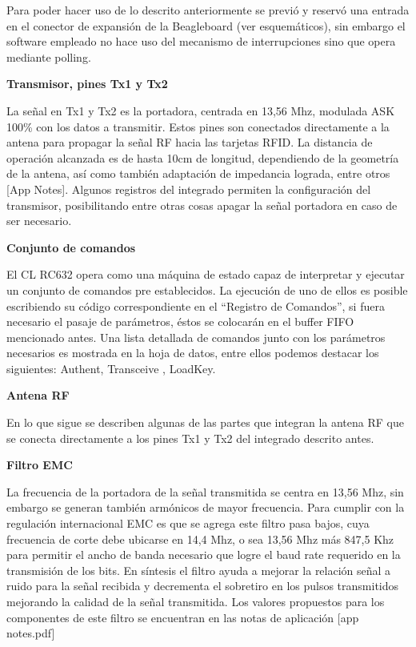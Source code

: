 Para poder hacer uso de lo descrito anteriormente se previó y reservó una entrada en el conector de expansión de la Beagleboard (ver esquemáticos), sin embargo el software empleado no hace uso del mecanismo de interrupciones sino que opera mediante polling.

\bigskip
{\bf{Transmisor, pines Tx1 y Tx2}}

La señal en Tx1 y Tx2 es la portadora, centrada en 13,56 Mhz, modulada ASK 100\% con los datos a transmitir. Estos pines son conectados directamente a la antena para propagar la señal RF hacia las tarjetas RFID. La distancia de operación alcanzada es de hasta 10cm de longitud, dependiendo de la geometría de la antena, así como también adaptación de impedancia lograda, entre otros [App Notes].
Algunos registros del integrado permiten la configuración del transmisor, posibilitando entre otras cosas apagar la señal portadora en caso de ser necesario.

\bigskip
{\bf{Conjunto de comandos}}

El CL RC632 opera como una máquina de estado capaz de interpretar y ejecutar un conjunto de comandos pre establecidos. La ejecución de uno de ellos es posible escribiendo su código correspondiente en el “Registro de Comandos”, si fuera necesario el pasaje de parámetros, éstos se colocarán en el buffer FIFO mencionado antes. 
Una lista detallada de comandos junto con los parámetros necesarios es mostrada en la hoja de datos, entre ellos podemos destacar los siguientes: Authent, Transceive , LoadKey.

\bigskip
{\bf{Antena RF}}

En lo que sigue se describen algunas de las partes que integran la antena RF que se conecta directamente a los pines Tx1 y Tx2 del integrado descrito antes.

\bigskip
{\bf{Filtro EMC}}

La frecuencia de la portadora de la señal transmitida se centra en 13,56 Mhz, sin embargo se generan también armónicos de mayor frecuencia. Para cumplir con la regulación internacional EMC es que se agrega este filtro pasa bajos, cuya frecuencia de corte debe ubicarse en 14,4 Mhz, o sea 13,56 Mhz más 847,5 Khz para permitir el ancho de banda necesario que logre el baud rate requerido en la transmisión de los bits. 
En síntesis el filtro ayuda a mejorar la relación señal a ruido para la señal recibida y decrementa el sobretiro en los pulsos transmitidos mejorando la calidad de la señal transmitida.
Los valores propuestos para los componentes de este filtro se encuentran en las notas de aplicación [app notes.pdf]


